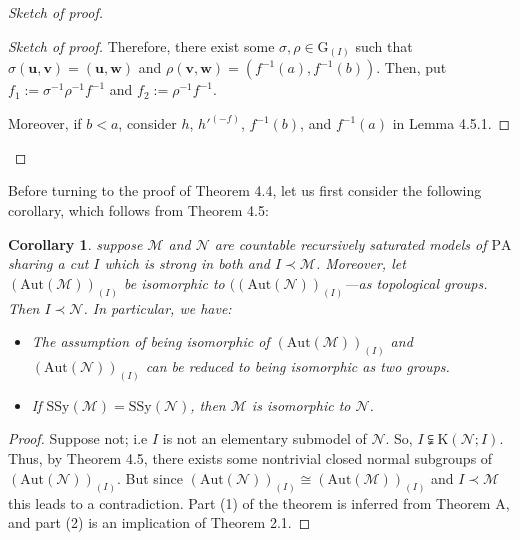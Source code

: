 \documentclass[11pt]{article}
\theoremstyle{plain}
\newtheorem{cor}[theorem]{Corollary}
\theoremstyle{definition}
\newcommand{\M}{\mathcal{M}}
\newcommand{\N}{\mathcal{N}}
\newcommand{\G}{\mathrm{G}}
\newcommand{\A}{\mathrm{Aut}}
\newcommand{\pa}{\mathrm{PA}}
\newcommand{\ssy}{\mathrm{SSy}}
\newcommand{\KK}{\mathrm{K}}
\begin{document}
\begin{proof}[Sketch of proof]
\begin{proof}[Sketch of proof]
Therefore, there exist some $\sigma,\rho\in\G_{(I)} $ such that $\sigma(\textbf{u},\textbf{v})=(\textbf{u},\textbf{w})$ and $\rho(\textbf{v},\textbf{w})=(f^{-1}(a),f^{-1}(b))$. Then, put $f_{1}:=\sigma^{-1}\rho^{-1}f^{-1}$ and $f_{2}:=\rho^{-1}f^{-1}$.

Moreover, if $b<a$, consider $h$, $h'^{(-f)}$, $f^{-1}(b)$, and $f^{-1}(a)$ in Lemma 4.5.1.
\end{proof}
\end{proof}
Before turning to the proof of Theorem 4.4, let us first consider the following corollary, which follows from Theorem 4.5:
\begin{cor}
suppose $\M$ and $\N$ are countable recursively saturated models of $\pa$ sharing a  cut $I$ which is strong in both and $I\prec\M$. Moreover, let $(\A(\M))_{(I)}$ be isomorphic to $((\A(\N))_{(I)}$---as topological groups. Then $I\prec\N$. In particular, we have:
\begin{itemize}
\item[(1)] The assumption of being isomorphic of $(\A(\M))_{(I)}$ and $(\A(\N))_{(I)}$ can be reduced to being isomorphic as two groups. 
\item[(2)] If $\ssy(\M)=\ssy(\N)$, then $\M$ is isomorphic to $\N$.
\end{itemize}
\end{cor}
\begin{proof}
Suppose not; i.e $I$ is not an elementary submodel of $\N$. So, $I\subsetneqq\KK(\N;I)$. Thus, by Theorem 4.5, there exists some nontrivial closed normal subgroups of  $(\A(\N))_{(I)}$. But since $(\A(\N))_{(I)}\cong(\A(\M))_{(I)} $ and $I\prec\M$ this leads to a contradiction. Part (1) of the theorem is inferred from Theorem A, and part (2) is an implication of Theorem 2.1.
\end{proof} 
\end{document}
